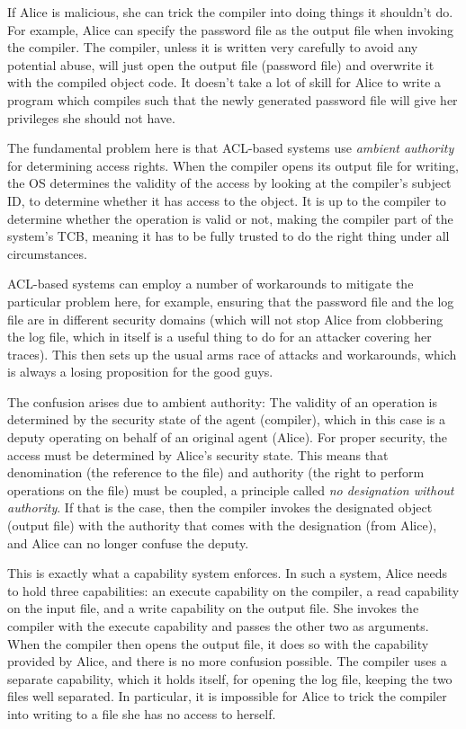 \documentclass[english,a4paper,12pt]{report}
\begin{document}
  If Alice is malicious, she can trick the compiler into doing things
  it shouldn't do. For example, Alice can specify the password file as
  the output file when invoking the compiler. The compiler, unless it
  is written very carefully to avoid any potential abuse, will just
  open the output file (password file) and overwrite it with the
  compiled object code. It doesn't take a lot of skill for Alice to
  write a program which compiles such that the newly generated
  password file will give her privileges she should not have.

  The fundamental problem here is that ACL-based systems use
  \emph{ambient authority} for determining access rights. When the
  compiler opens its output file for writing, the OS determines the
  validity of the access by looking at the compiler's subject ID, to
  determine whether it has access to the object. It is up to the
  compiler to determine whether the operation is valid or not, making
  the compiler part of the system's TCB, meaning it has to be fully
  trusted to do the right thing under all circumstances.

  ACL-based systems can employ a number of workarounds to mitigate the
  particular problem here, for example, ensuring that the password
  file and the log file are in different security domains (which will
  not stop Alice from clobbering the log file, which in itself is a
  useful thing to do for an attacker covering her traces). This then
  sets up the usual arms race of attacks and workarounds, which is
  always a losing proposition for the good guys.

  The confusion arises due to ambient authority: The validity of
  an operation is determined by the security state of the agent
  (compiler), which in this case is a deputy operating on behalf of an
  original agent (Alice). For proper security, the access must be
  determined by Alice's security state. This means that denomination
  (the reference to the file) and authority (the right to perform
  operations on the file) must be coupled, a principle called \emph{no
    designation without authority}. If that is the case, then the
  compiler invokes the designated object (output file) with the
  authority that comes with the designation (from Alice), and Alice
  can no longer confuse the deputy.

  This is exactly what a capability system enforces. In such a system,
  Alice needs to hold three capabilities: an execute capability on the
  compiler, a read capability on the input file, and a write
  capability on the output file. She invokes the compiler with the
  execute capability and passes the other two as arguments. When the
  compiler then opens the output file, it does so with the capability
  provided by Alice, and there is no more confusion possible. The
  compiler uses a separate capability, which it holds itself, for
  opening the log file, keeping the two files well separated. In
  particular, it is impossible for Alice to trick the compiler into
  writing to a file she has no access to herself.
\end{document}
